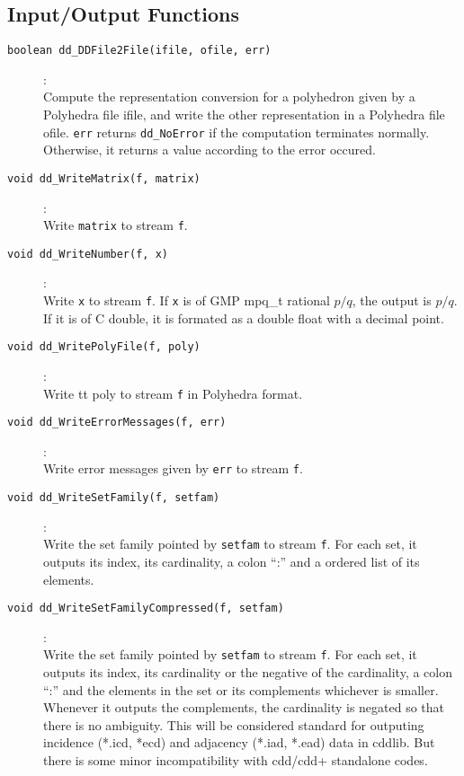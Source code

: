 \documentclass[11pt]{article}
\newcommand {\0} {{\bf 0}}
\begin{document}
\subsection{Input/Output Functions}  \label{IOLibrary}
\begin{description}

\item[{\tt boolean dd\_DDFile2File(ifile, ofile, err)}]:\\
Compute the representation conversion for a polyhedron given
by a Polyhedra file ifile, and write the other representation
in a Polyhedra file ofile.  {\tt *err}
returns {\tt dd\_NoError} if the computation terminates normally.  Otherwise,
it returns a value according to the error occured.

\item[{\tt void dd\_WriteMatrix(f, matrix)}]:\\
Write {\tt  matrix} to stream {\tt f}.

\item[{\tt void dd\_WriteNumber(f, x)}]:\\
Write {\tt x} to stream {\tt f}.  If {\tt x} is of GMP mpq\_t rational $p/q$,
the output is $p/q$.  If it is of C double, it is formated as a double float
with a decimal point.

\item[{\tt void dd\_WritePolyFile(f, poly)}]:\\
Write {tt poly} to stream {\tt f} in Polyhedra format.

\item[{\tt void dd\_WriteErrorMessages(f, err)}]:\\
Write error messages given by {\tt err} to stream {\tt f}.

\item[{\tt void dd\_WriteSetFamily(f, setfam)}]:\\
Write the set family pointed by {\tt setfam} to stream {\tt f}.
For each set, it outputs its index, its cardinality,
a colon ``:'' and a ordered list of its elements.

\item[{\tt void dd\_WriteSetFamilyCompressed(f, setfam)}]:\\
Write the set family pointed by {\tt setfam} to stream {\tt f}.
For each set, it outputs its index, its cardinality or the
negative of the cardinality, a colon ``:''
 and the elements in the set or its complements whichever is smaller.
Whenever it outputs the complements, the cardinality is negated
so that there is no ambiguity.
This will be considered standard for
outputing incidence (*.icd, *ecd) and adjacency 
(*.iad, *.ead) data in cddlib.   But there is some minor incompatibility
with cdd/cdd+ standalone codes.


\end{description}
\end{document}
